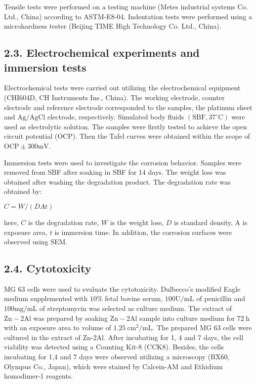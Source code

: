 \documentclass[10pt]{article}
\begin{document}
Tensile tests were performed on a testing machine (Metes industrial systems Co. Ltd., China) according to ASTM-E8-04. Indentation tests were performed using a microhardness tester (Beijing TIME High Technology Co. Ltd., China).

\subsection*{2.3. Electrochemical experiments and immersion tests}
Electrochemical tests were carried out utilizing the electrochemical equipment (CHI604D, CH Instruments Ins., China). The working electrode, counter electrode and reference electrode corresponded to the samples, the platinum sheet and $\mathrm{Ag} / \mathrm{AgCl}$ electrode, respectively. Simulated body fluids $\left(\mathrm{SBF}, 37^{\circ} \mathrm{C}\right)$ were used as electrolytic solution. The samples were firstly tested to achieve the open circuit potential (OCP). Then the Tafel curves were obtained within the scope of $\mathrm{OCP} \pm 300 \mathrm{mV}$.

Immersion tests were used to investigate the corrosion behavior. Samples were removed from SBF after soaking in SBF for 14 days. The weight loss was obtained after washing the degradation product. The degradation rate was obtained by:

$C=W /(D A t)$

here, $C$ is the degradation rate, $W$ is the weight loss, $D$ is standard density, $\mathrm{A}$ is exposure area, $t$ is immersion time. In addition, the corrosion surfaces were observed using SEM.

\subsection*{2.4. Cytotoxicity}
MG 63 cells were used to evaluate the cytotoxicity. Dulbecco's modified Eagle medium supplemented with $10 \%$ fetal bovine serum, $100 \mathrm{U} / \mathrm{mL}$ of penicillin and $100 \mathrm{mg} / \mathrm{mL}$ of streptomycin was selected as culture medium. The extract of $\mathrm{Zn}-2 \mathrm{Al}$ was prepared by soaking $\mathrm{Zn}-2 \mathrm{Al}$ sample into culture medium for $72 \mathrm{~h}$ with an exposure area to volume of $1.25 \mathrm{~cm}^{2} / \mathrm{mL}$. The prepared MG 63 cells were cultured in the extract of Zn-2Al. After incubating for 1, 4 and 7 days, the cell viability was detected using a Counting Kit-8 (CCK8). Besides, the cells incubating for 1,4 and 7 days were observed utilizing a microscopy (BX60, Olympus Co., Japan), which were stained by Calcein-AM and Ethidium homodimer-1 reagents.
\end{document}
